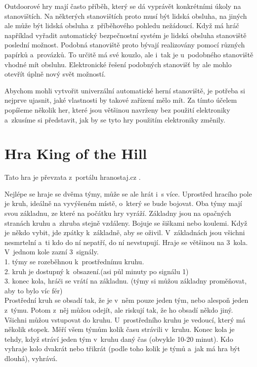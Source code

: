 Outdoorové hry mají často příběh, který se dá vyprávět konkrétními úkoly na stanovištích.
Na některých stanovištích proto musí být lidská obsluha, na jiných ale může být lidská obsluha z~příběhového pohledu nežádoucí.
Když má hráč například vyřadit automatický bezpečnostní systém je lidská obsluha stanoviště poslední možnost.
Podobná stanoviště proto bývají realizovány pomocí různých papírků a~provázků.
To určitě má své kouzlo, ale i~tak je u~podobného stanoviště vhodné mít obsluhu.
Elektronické řešení podobných stanovišť by ale mohlo otevřít úplně nový svět možností.

Abychom mohli vytvořit univerzální automatické herní stanoviště, je potřeba si nejprve ujasnit, jaké vlastnosti by takové zařízení mělo mít.
Za tímto účelem popíšeme několik her, které jsou většinou navrženy bez použití elektroniky a~zkusíme si představit, jak by se tyto hry použitím elektroniky změnily.

\section{Hra King of the Hill \label{KOTH} }
Tato hra je převzata z~portálu hranostaj.cz \cite{KingOfTheHill}.

Nejlépe se hraje se dvěma týmy, může se ale hrát i~s více. 
Uprostřed hracího pole je kruh, ideálně na vyvýšeném místě, o~který se bude bojovat. 
Oba týmy mají svou základnu, ze které na počátku hry vyráží.
Základny jsou na opačných stranách kruhu a~zhruba stejně vzdáleny.
Bojuje se šiškami nebo koulemi. 
Když je někdo vybit, jde zpátky k~základně, aby se oživil. 
V~základnách jsou všichni nesmrtelní a~ti kdo do ní nepatří, do ní nevstupují.
Hraje se většinou na 3~kola. 
V~jednom kole zazní 3~signály.\\
1. týmy se rozeběhnou k~prostřednímu kruhu.\\
2. kruh je dostupný k~obsazení.(asi půl minuty po signálu 1)\\
3. konec kola, hráči se vrátí na základnu. (týmy si můžou základny proměňovat, aby to bylo víc fér)\\
Prostřední kruh se obsadí tak, že je v~něm pouze jeden tým, nebo alespoň jeden z~týmu. 
Potom z~něj můžou odejít, ale riskují tak, že ho obsadí někdo jiný. 
Všichni můžou vstupovat do kruhu.
U~prostředního kruhu je vedoucí, který má několik stopek. 
Měří všem týmům kolik času strávili v~kruhu. 
Konec kola je tehdy, když stráví jeden tým v~kruhu daný čas (obvykle 10-20 minut). 
Kdo vyhraje kolo dvakrát nebo třikrát (podle toho kolik je týmů a~jak má hra být dlouhá), vyhrává.

